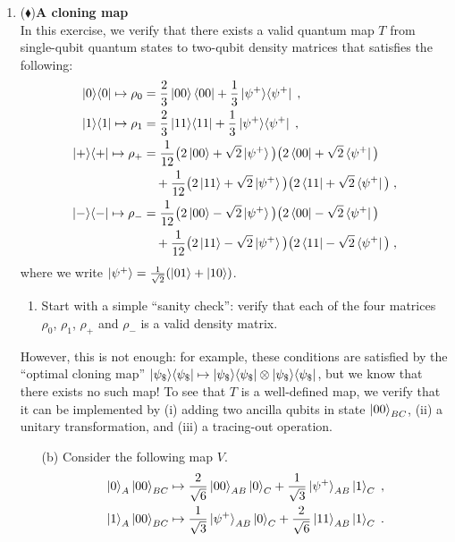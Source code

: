 \documentclass[12pt]{article}
\begin{document}
\begin{enumerate}
\item {($\blacklozenge$)\;\bf A cloning map}\label{ex:2-qmamp}\\
In this exercise, we verify that there exists a valid quantum map $T$ from single-qubit quantum states to two-qubit density matrices that satisfies the following:
\begin{align*}
\ket{0}\!\bra{0} \mapsto \rho_0 &= \frac{2}{3} \ket{00}\bra{00} + \frac{1}{3} \ket{\psi^+}\!\bra{\psi^+} \;,\\
\ket{1}\!\bra{1} \mapsto \rho_1 &= \frac{2}{3} \ket{11}\!\bra{11} + \frac{1}{3} \ket{\psi^+}\!\bra{\psi^+} \;,\\
\ket{+}\!\bra{+} \mapsto \rho_+ &= \frac{1}{12} \big( 2\ket{00}+ \sqrt{2}\ket{\psi^+} \big)\big( 2\bra{00}+ \sqrt{2}\bra{\psi^+} \big) \\
&\quad+ \frac{1}{12} \big( 2\ket{11}+ \sqrt{2}\ket{\psi^+} \big)\big( 2\bra{11}+\sqrt{2} \bra{\psi^+} \big)\;,\\
\ket{-}\!\bra{-} \mapsto \rho_- &= \frac{1}{12} \big( 2\ket{00}-\sqrt{2}\ket{\psi^+} \big)\big( 2\bra{00}- \sqrt{2}\bra{\psi^+} \big) \\
&\quad+ \frac{1}{12} \big( 2\ket{11}- \sqrt{2}\ket{\psi^+} \big)\big( 2\bra{11}-\sqrt{2} \bra{\psi^+} \big)\;,
\end{align*}
where we write $\ket{\psi^+} = \frac{1}{\sqrt{2}}(\ket{01}+\ket{10})$. 
\begin{enumerate}
\item Start with a simple ``sanity check'': verify that each of the four matrices $\rho_0$, $\rho_1$, $\rho_+$ and $\rho_-$ is a valid density matrix. 
\end{enumerate}
However, this is not enough: for example, these conditions are satisfied by the ``optimal cloning map'' $\ket{\psi_\$}\!\bra{\psi_\$}\mapsto \ket{\psi_\$}\!\bra{\psi_\$}\otimes \ket{\psi_\$}\!\bra{\psi_\$}$, but we know that there exists no such map! To see that $T$ is a well-defined map, we verify that it can be implemented by (i) adding two ancilla qubits in state $\ket{00}_{BC}$, (ii) a unitary transformation, and (iii) a tracing-out operation. 
\begin{enumerate}
\item[(b)] Consider the following map $V$.  
\begin{align*}
\ket{0}_A \ket{00}_{BC} \mapsto \frac{2}{\sqrt{6}}\ket{00}_{AB}\ket{0}_C + \frac{1}{\sqrt{3}} \ket{\psi^+}_{AB} \ket{1}_C \;,\\
\ket{1}_A \ket{00}_{BC} \mapsto  \frac{1}{\sqrt{3}} \ket{\psi^+}_{AB}\ket{0}_C + \frac{2}{\sqrt{6}}\ket{11}_{AB}\ket{1}_C \;.
\end{align*}

\end{enumerate}
\end{enumerate}
\end{document}
